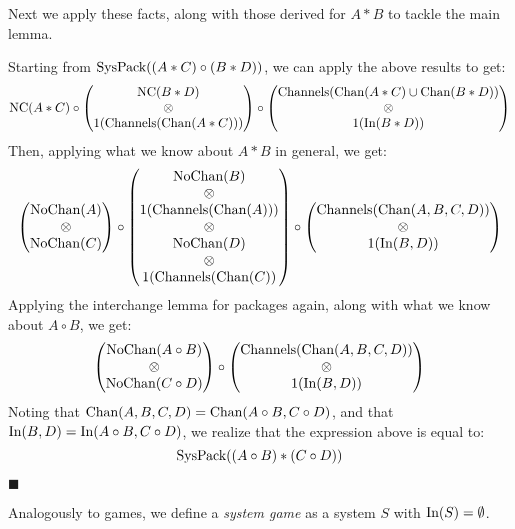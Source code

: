 \begin{lemma}
Next we apply these facts, along with those derived for $A * B$ to tackle the main lemma.

Starting from $\text{SysPack}((A * C) \circ (B * D))$, we can apply the above
results to get:
$$
  \text{NC}(A * C) \circ
  \begin{pmatrix}
    \text{NC}(B * D)\cr
    \otimes\cr
    1(\text{Channels}(\text{Chan}(A * C)))
  \end{pmatrix}
  \circ
  \begin{pmatrix}
    \text{Channels}(\text{Chan}(A * C) \cup \text{Chan}(B * D))\cr
    \otimes\cr
    1(\text{In}(B * D))
  \end{pmatrix}
$$
Then, applying what we know about $A * B$ in general, we get:
$$
  \begin{pmatrix}
    \text{NoChan}(A)\cr
    \otimes\cr
    \text{NoChan}(C)
  \end{pmatrix}
  \circ
  \begin{pmatrix}
    \text{NoChan}(B)\cr
    \otimes\cr
    1(\text{Channels}(\text{Chan}(A)))\cr
    \otimes\cr
    \text{NoChan}(D)\cr
    \otimes\cr
    1(\text{Channels}(\text{Chan}(C))
  \end{pmatrix}
  \circ
  \begin{pmatrix}
    \text{Channels}(\text{Chan}(A, B, C, D))\cr
    \otimes\cr
    1(\text{In}(B, D))
  \end{pmatrix}
$$
Applying the interchange lemma for packages again, along with 
what we know about $A \circ B$, we get:
$$
\begin{pmatrix}
  \text{NoChan}(A \circ B)\cr
  \otimes\cr
  \text{NoChan}(C \circ D)
\end{pmatrix}
  \circ
  \begin{pmatrix}
    \text{Channels}(\text{Chan}(A, B, C, D))\cr
    \otimes\cr
    1(\text{In}(B, D))
  \end{pmatrix}
$$
Noting that $\text{Chan}(A, B, C, D) = \text{Chan}(A \circ B, C \circ D)$,
and that $\text{In}(B, D) = \text{In}(A \circ B, C \circ D)$, we realize that the
expression above is equal to:
$$
\text{SysPack}((A \circ B) * (C \circ D))
$$

$\blacksquare$
\end{lemma}

\begin{definition}
Analogously to games, we define a \emph{system game} as a system $S$
with $\text{In}(S) = \emptyset$.
\end{definition}

